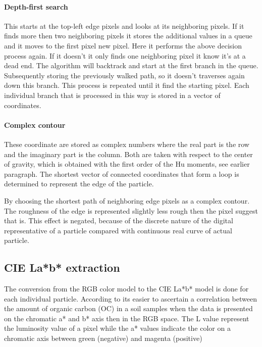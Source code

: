 \documentclass[11pt,fleqn,,a4paper,twoside,openright]{book}
\begin{document}
\paragraph{Depth-first search}\label{Depth-first search}
This starts at the top-left edge pixels and looks at its neighboring pixels. If it finds more then two neighboring pixels it stores the additional values in a queue and it moves to the first pixel new pixel. Here it performs the above decision process again. If it doesn't it only finds one neighboring pixel it know it's at a dead end. The algorithm will backtrack and start at the first branch in the queue. Subsequently storing the previously walked path, so it doesn't traverses again down this branch. This process is repeated until it find the starting pixel. Each individual branch that is processed in this way is stored in a vector of coordinates.

\paragraph{Complex contour}\label{Complex contour}
These coordinate are stored as complex numbers where the real part is the row and the imaginary part is the column. Both are taken with respect to the center of gravity, which is obtained with the first order of the Hu moments, see earlier paragraph.
The shortest vector of connected coordinates that form a loop is determined to represent the edge of the particle. 

\begin{remark}
	By choosing the shortest path of neighboring edge pixels as a complex contour. The roughness of the edge is represented slightly less rough then the pixel suggest that is. This effect is negated, because of the discrete nature of the digital representative of a particle compared with continuous real curve of actual particle.	
\end{remark}

\subsection{CIE La*b* extraction}\label{CIELab}
The conversion from the RGB color model to the CIE La*b* model is done for each individual particle. According to \citeauthor{Spijker14a} \cite{Spijker14a} its easier to ascertain a correlation between the amount of organic carbon (OC) in a soil samples when the data is presented on the chromatic a* and b* axis then in the RGB space. The L value represent the luminosity value of a pixel while the a* values indicate the color on a chromatic axis between green (negative) and magenta (positive)
\end{document}

